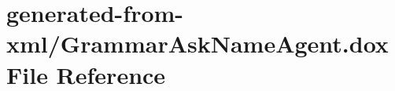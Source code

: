 \hypertarget{GrammarAskNameAgent_8dox}{}\section{generated-\/from-\/xml/\+Grammar\+Ask\+Name\+Agent.dox File Reference}
\label{GrammarAskNameAgent_8dox}
